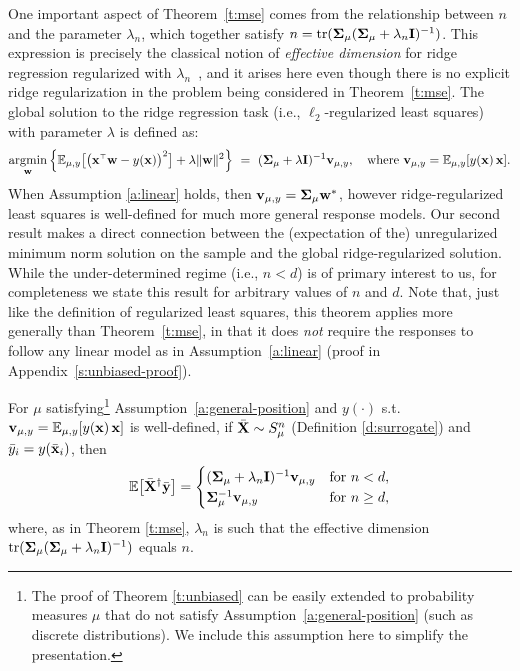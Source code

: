 \documentclass[11pt]{article}
\begin{document}
One important aspect of Theorem~\ref{t:mse} comes from the relationship between $n$ and the parameter $\lambda_n$, which together satisfy $n=\mathrm{tr}(\mathbf{\Sigma}_\mu (\mathbf{\Sigma}_\mu+\lambda_n\mathbf I)^{-1})$.
This expression is precisely the classical notion of \emph{effective
  dimension} for ridge regression regularized with
$\lambda_n$~\citep{ridge-leverage-scores}, and it arises here even though there is
no explicit ridge regularization in the problem being considered in
Theorem~\ref{t:mse}. 
The global solution to the ridge regression task (i.e., $\ell_2$-regularized
least squares) with parameter $\lambda$ is defined as:
\begin{align*}
\argmin_\w \Big\{\E_{\mu,y}\big[\big(\x^\top\w-y(\x)\big)^2\big]
    + \lambda\|\w\|^2\Big\}\ =\ (\Sigmab_\mu +
  \lambda\I)^{-1}\v_{\mu,y},\quad\text{where } \v_{\mu,y}=\E_{\mu,y}[y(\x)\,\x ].
\end{align*}
When Assumption \ref{a:linear} holds, then
$\mathbf v_{\mu,y}=\mathbf{\Sigma}_\mu\mathbf w^*$, however ridge-regularized least squares
is well-defined for much more general response models.
Our second result makes a direct connection between the (expectation
of the) unregularized minimum norm solution on the sample
and the global ridge-regularized solution.
While the under-determined regime (i.e., $n<d$) is of primary interest to us,
for completeness we state this result for arbitrary values of $n$ and $d$.
Note that, just like the definition of regularized least squares, this
theorem applies more generally than Theorem~\ref{t:mse}, in that it
does \emph{not} require the responses to follow any linear model as in
Assumption~\ref{a:linear} (proof in Appendix~\ref{s:unbiased-proof}). 
\begin{theorem}
\label{t:unbiased}
For $\mu$ satisfying\footnote{The proof of Theorem \ref{t:unbiased}
  can be easily extended to probability measures $\mu$ that do not
  satisfy Assumption~\ref{a:general-position} (such as discrete distributions). We include this
  assumption here to simplify the presentation.} Assumption~\ref{a:general-position} and
  $y(\cdot)$ s.t.~$\mathbf v_{\mu,y}=\mathbb E_{\mu,y}[y(\mathbf x)\,\mathbf x]$ is well-defined, if
  ${\bar{\mathbf X}}\sim S_\mu^n$ (Definition \ref{d:surrogate}) and ${\bar y}_i=y(\bar{\mathbf x}_i)$, then
  \begin{align*}
    \mathbb E\big[{\bar{\mathbf X}}^\dagger\bar{\mathbf y}\big] =
    \begin{cases}
       (\mathbf{\Sigma}_\mu + \lambda_n\mathbf I)^{-1}\mathbf v_{\mu,y} &\text{for }n<d,\\
        \mathbf{\Sigma}_\mu^{-1}\mathbf v_{\mu,y} &\text{for }n \ge d,
    \end{cases}
  \end{align*}
  where, as in Theorem \ref{t:mse}, $\lambda_n$ is such that the effective dimension
  $\mathrm{tr}(\mathbf{\Sigma}_\mu(\mathbf{\Sigma}_\mu+\lambda_n\mathbf I)^{-1})$ equals $n$.
\end{theorem}
\end{document}
